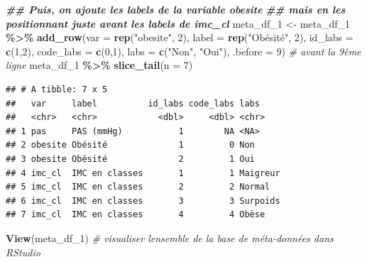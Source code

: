 \documentclass[
]{book}
\newenvironment{Shaded}{\begin{snugshade}}{\end{snugshade}}
\newcommand{\AttributeTok}[1]{\textcolor[rgb]{0.13,0.29,0.53}{#1}}
\newcommand{\CommentTok}[1]{\textcolor[rgb]{0.56,0.35,0.01}{\textit{#1}}}
\newcommand{\DecValTok}[1]{\textcolor[rgb]{0.00,0.00,0.81}{#1}}
\newcommand{\DocumentationTok}[1]{\textcolor[rgb]{0.56,0.35,0.01}{\textbf{\textit{#1}}}}
\newcommand{\FunctionTok}[1]{\textcolor[rgb]{0.13,0.29,0.53}{\textbf{#1}}}
\newcommand{\NormalTok}[1]{#1}
\newcommand{\OtherTok}[1]{\textcolor[rgb]{0.56,0.35,0.01}{#1}}
\newcommand{\SpecialCharTok}[1]{\textcolor[rgb]{0.81,0.36,0.00}{\textbf{#1}}}
\newcommand{\StringTok}[1]{\textcolor[rgb]{0.31,0.60,0.02}{#1}}
\begin{document}
\begin{Shaded}
\begin{Highlighting}[]
\DocumentationTok{\#\# Puis, on ajoute les labels de la variable obesite }
\DocumentationTok{\#\# mais en les positionnant juste avant les labels de imc\_cl}
\NormalTok{meta\_df\_1 }\OtherTok{\textless{}{-}}\NormalTok{ meta\_df\_1 }\SpecialCharTok{\%\textgreater{}\%} \FunctionTok{add\_row}\NormalTok{(}\AttributeTok{var =} \FunctionTok{rep}\NormalTok{(}\StringTok{"obesite"}\NormalTok{, }\DecValTok{2}\NormalTok{), }
                                   \AttributeTok{label =} \FunctionTok{rep}\NormalTok{(}\StringTok{"Obésité"}\NormalTok{, }\DecValTok{2}\NormalTok{), }
                                   \AttributeTok{id\_labs =} \FunctionTok{c}\NormalTok{(}\DecValTok{1}\NormalTok{,}\DecValTok{2}\NormalTok{), }
                                   \AttributeTok{code\_labs =} \FunctionTok{c}\NormalTok{(}\DecValTok{0}\NormalTok{,}\DecValTok{1}\NormalTok{),}
                                   \AttributeTok{labs =} \FunctionTok{c}\NormalTok{(}\StringTok{"Non"}\NormalTok{, }\StringTok{"Oui"}\NormalTok{), }
                                   \AttributeTok{.before =} \DecValTok{9}\NormalTok{) }\CommentTok{\# avant la 9ème ligne}
\NormalTok{meta\_df\_1 }\SpecialCharTok{\%\textgreater{}\%} \FunctionTok{slice\_tail}\NormalTok{(}\AttributeTok{n =} \DecValTok{7}\NormalTok{)}
\end{Highlighting}
\end{Shaded}

\begin{verbatim}
## # A tibble: 7 x 5
##   var     label          id_labs code_labs labs    
##   <chr>   <chr>            <dbl>     <dbl> <chr>   
## 1 pas     PAS (mmHg)           1        NA <NA>    
## 2 obesite Obésité              1         0 Non     
## 3 obesite Obésité              2         1 Oui     
## 4 imc_cl  IMC en classes       1         1 Maigreur
## 5 imc_cl  IMC en classes       2         2 Normal  
## 6 imc_cl  IMC en classes       3         3 Surpoids
## 7 imc_cl  IMC en classes       4         4 Obèse
\end{verbatim}

\begin{Shaded}
\begin{Highlighting}[]
\FunctionTok{View}\NormalTok{(meta\_df\_1) }\CommentTok{\# visualiser l\textquotesingle{}ensemble de la base de méta{-}données dans RStudio}
\end{Highlighting}
\end{Shaded}
\end{document}
